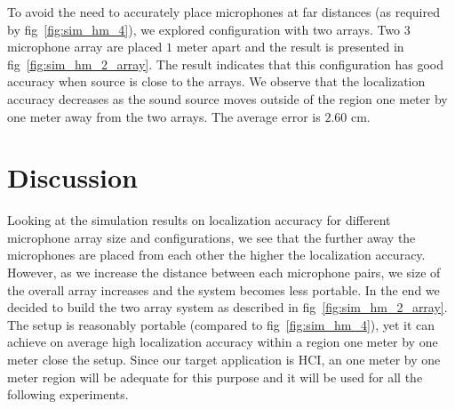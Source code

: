 To avoid the need to accurately place microphones at far distances (as required by fig~\ref{fig:sim_hm_4}), we explored configuration with two arrays. Two $3$ microphone array are placed $1$ meter apart and the result is presented in fig~\ref{fig:sim_hm_2_array}.  The result indicates that this configuration has good accuracy when source is close to the arrays. We observe that the localization accuracy decreases as the sound source moves outside of the region one meter by one meter away from the two arrays. The average error is $2.60$ cm. 


\section{Discussion}

Looking at the simulation results on localization accuracy for different microphone array size and configurations, we see that the further away the microphones are placed from each other the higher the localization accuracy. However, as we increase the distance between each microphone pairs, we size of the overall array increases and the system becomes less portable. In the end we decided to build the two array system as described in fig~\ref{fig:sim_hm_2_array}. The setup is reasonably portable (compared to fig~\ref{fig:sim_hm_4}), yet it can achieve on average high localization accuracy within a region one meter by one meter close the setup. Since our target application is HCI, an one meter by one meter region will be adequate for this purpose and it will be used for all the following experiments.   
